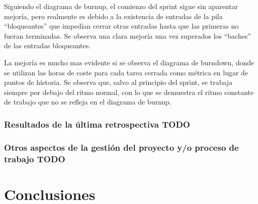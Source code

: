 \documentclass[11pt,a4paper]{report}
\begin{document}
Siguiendo el diagrama de burnup, el comienzo del sprint sigue sin aparentar mejoría, pero realmente es debido a la existencia de entradas de la pila “bloqueantes” que impedían cerrar otras entradas hasta que las primeras no fueran terminadas. Se observa una clara mejoría una vez superados los “baches” de las entradas bloqueantes.
 

La mejoría es mucho mas evidente si se observa el diagrama de burndown, donde se utilizan las horas de coste para cada tarea cerrada como métrica en lugar de puntos de historia. Se observa que, salvo al principio del sprint, se trabaja siempre por debajo del ritmo normal, con lo que se demuestra el ritmo constante de trabajo que no se refleja en el diagrama de burnup.
\subsection{Resultados de la última retrospectiva TODO}
\subsection{Otros aspectos de la gestión del proyecto y/o proceso de trabajo TODO}

\chapter{Conclusiones}
\end{document}
